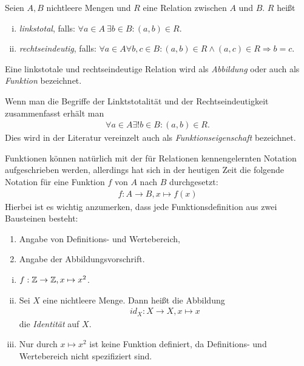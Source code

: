 \begin{mydef}
    Seien $A,B$  nichtleere Mengen und $R$ eine Relation zwischen $A$ und $B$. $R$ heißt 
    \begin{enumerate}[(i)]
        \item 
        \textit{linkstotal}, falls: $\forall a \in A \ \exists b \in B : (a,b) \in R$. 
        \item
        \textit{rechtseindeutig}, falls: $\forall a \in A \forall b,c \in B: (a,b) \in R \wedge (a,c) \in R \Rightarrow b = c $. 
    \end{enumerate}
    Eine linkstotale und rechtseindeutige Relation wird als \textit{Abbildung} oder auch als \textit{Funktion} bezeichnet. 
\end{mydef}

\begin{remark}
    Wenn man die Begriffe der Linktstotalität und der Rechtseindeutigkeit zusammenfasst erhält man 
    \begin{align}
        \forall a \in A \exists ! b \in B : (a,b) \in R. 
    \end{align}
    Dies wird in der Literatur vereinzelt auch als \textit{Funktionseigenschaft} bezeichnet. 
\end{remark}

\begin{remark}
    Funktionen können natürlich mit der für Relationen kennengelernten Notation aufgeschrieben werden, allerdings hat sich in der heutigen Zeit die folgende Notation
    für eine Funktion $f$ von $A$ nach $B$ durchgesetzt: 
    \begin{align*}
        f : A \to B, x \mapsto f(x)
    \end{align*}
    Hierbei ist es wichtig anzumerken, dass jede Funktionsdefinition aus zwei Bausteinen besteht: 
    \begin{enumerate}
        \item Angabe von Definitions- und Wertebereich,
        \item Angabe der Abbildungsvorschrift. 
    \end{enumerate}
\end{remark}

\begin{example}
    \begin{enumerate}[(i)]
        \item
        $f: \mathbb{Z} \to \mathbb{Z}, x \mapsto x^2 $. 
        \item 
        Sei $X$ eine nichtleere Menge. Dann heißt die Abbildung 
        \begin{align*}
            id_X : X \to X, x \mapsto x
        \end{align*}
        die \textit{Identität} auf $X$. 
        \item 
        Nur durch $x \mapsto x^2$ ist keine Funktion definiert, da Definitions- und Wertebereich nicht spezifiziert sind. 
    \end{enumerate}
\end{example}

